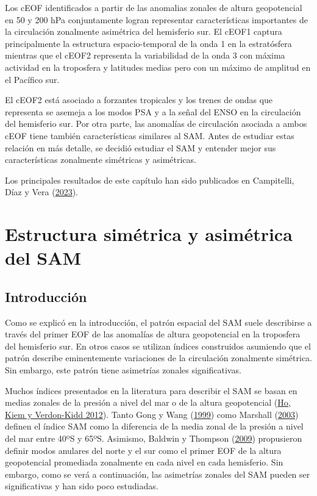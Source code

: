\documentclass[12pt,oneside,a4paper]{reedthesis}
\begin{document}
Los cEOF identificados a partir de las anomalias zonales de altura geopotencial en 50 y 200 hPa conjuntamente logran representar características importantes de la circulación zonalmente asimétrica del hemisferio sur.
El cEOF1 captura principalmente la estructura espacio-temporal de la onda 1 en la estratósfera mientras que el cEOF2 representa la variabilidad de la onda 3 con máxima actividad en la troposfera y latitudes medias pero con un máximo de amplitud en el Pacífico sur.

El cEOF2 está asociado a forzantes tropicales y los trenes de ondas que representa se asemeja a los modos PSA y a la señal del ENSO en la circulación del hemisferio sur.
Por otra parte, las anomalías de circulación asociada a ambos cEOF tiene también características similares al SAM.
Antes de estudiar estas relación en más detalle, se decidió estudiar el SAM y entender mejor sus características zonalmente simétricas y asimétricas.

Los principales resultados de este capítulo han sido publicados en Campitelli, Díaz y Vera (\protect\hyperlink{ref-campitelli2023}{2023}).

\hypertarget{asymsam}{%
\chapter{Estructura simétrica y asimétrica del SAM}\label{asymsam}}

\hypertarget{introducciuxf3n-1}{%
\section{Introducción}\label{introducciuxf3n-1}}

Como se explicó en la introducción, el patrón espacial del SAM suele describirse a través del primer EOF de las anomalías de altura geopotencial en la troposfera del hemisferio sur.
En otros casos se utilizan índices construidos asumiendo que el patrón describe eminentemente variaciones de la circulación zonalmente simétrica.
Sin embargo, este patrón tiene asimetrías zonales significativas.

Muchos índices presentados en la literatura para describir el SAM se basan en medias zonales de la presión a nivel del mar o de la altura geopotencial (\protect\hyperlink{ref-ho2012}{Ho, Kiem y Verdon-Kidd 2012}).
Tanto Gong y Wang (\protect\hyperlink{ref-gong1999}{1999}) como Marshall (\protect\hyperlink{ref-marshall2003}{2003}) definen el índice SAM como la diferencia de la media zonal de la presión a nivel del mar entre 40ºS y 65ºS.
Asimismo, Baldwin y Thompson (\protect\hyperlink{ref-baldwin2009}{2009}) propusieron definir modos anulares del norte y el sur como el primer EOF de la altura geopotencial promediada zonalmente en cada nivel en cada hemisferio.
Sin embargo, como se verá a continuación, las asimetrías zonales del SAM pueden ser significativas y han sido poco estudiadas.
\end{document}
